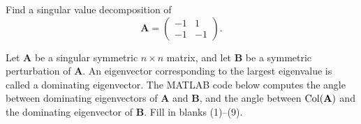 \begin{problem}
Find a singular value decomposition of
\[
\mathbf A=
\begin{pmatrix}
-1&1\\
-1&-1
\end{pmatrix}.
\]
\end{problem}

\begin{problem}
Let $\mathbf A$ be a singular symmetric $n\times n$ matrix, and let $\mathbf B$ be a symmetric perturbation of $\mathbf A$. An eigenvector corresponding to the largest eigenvalue is called a dominating eigenvector. The MATLAB code below computes the angle between dominating eigenvectors of $\mathbf A$ and $\mathbf B$, and the angle between $\operatorname{Col}(\mathbf A)$ and the dominating eigenvector of $\mathbf B$. Fill in blanks \textup{(1)}--\textup{(9)}.


\end{problem}
